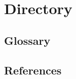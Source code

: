 \chapter{Directory}
\printbibliography

\section{Glossary}

\section{References}

\listoftables

\listoffigures